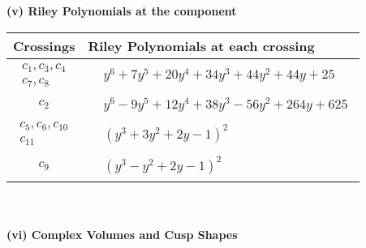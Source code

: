 \documentclass[1p]{elsarticle_modified}
\theoremstyle{definition}
\begin{document}
\newpage\renewcommand{\arraystretch}{1}
\flushleft \textbf{(v) Riley Polynomials at the component}\newline \\
\begin{tabular}{m{50pt}|m{274pt}}
Crossings & \hspace{64pt}Riley Polynomials at each crossing \\
\hline $$\begin{aligned}c_{1},c_{3},c_{4}\\c_{7},c_{8}\end{aligned}$$&$\begin{aligned}
&y^6+7 y^5+20 y^4+34 y^3+44 y^2+44 y+25
\end{aligned}$\\
\hline $$\begin{aligned}c_{2}\end{aligned}$$&$\begin{aligned}
&y^6-9 y^5+12 y^4+38 y^3-56 y^2+264 y+625
\end{aligned}$\\
\hline $$\begin{aligned}c_{5},c_{6},c_{10}\\c_{11}\end{aligned}$$&$\begin{aligned}
&(y^3+3 y^2+2 y-1)^2
\end{aligned}$\\
\hline $$\begin{aligned}c_{9}\end{aligned}$$&$\begin{aligned}
&(y^3- y^2+2 y-1)^2
\end{aligned}$\\
\hline
\end{tabular}\\~\\
\newpage\flushleft \textbf{(vi) Complex Volumes and Cusp Shapes}
\end{document}
